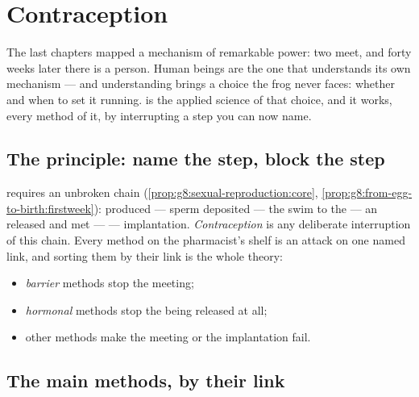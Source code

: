 \chapter{Contraception}\label{ch:g8:contraception}

The last chapters mapped a mechanism of remarkable power:
two  meet, and forty weeks later there is a person.
Human beings are the one  that understands its own
mechanism --- and understanding brings a choice the frog
never faces: whether and when to set it running.
\emph{} is the applied science of that choice,
and it works, every method of it, by interrupting a step you
can now name.

\section{The principle: name the step, block the step}

\begin{proposition}\label{prop:g8:contraception:principle}
 requires an unbroken chain
(\cref{prop:g8:sexual-reproduction:core},
\cref{prop:g8:from-egg-to-birth:firstweek}): 
produced --- sperm deposited --- the swim to the 
--- an  released and met ---  ---
implantation. \emph{Contraception} is
any deliberate interruption of this chain. Every method on
the pharmacist's shelf is an attack on one named link, and
sorting them by their link is the whole theory:
\begin{itemize}
  \item \emph{barrier} methods stop the  meeting;
  \item \emph{hormonal} methods stop the  being
        released at all;
  \item other methods make the meeting or the implantation
        fail.
\end{itemize}
\end{proposition}
\admitted

\section{The main methods, by their link}

